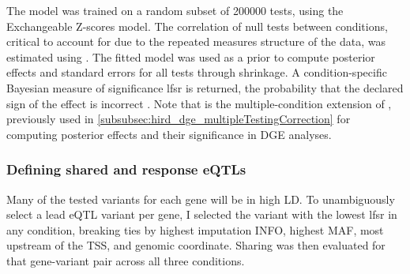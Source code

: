 The  model was trained on a random subset of 200000 tests, using the Exchangeable Z-scores model\autocite{urbut2018FlexibleStatisticalMethods}.
The correlation of null tests between conditions, critical to account for due to the repeated measures structure of the data, was estimated using .
The fitted model was used as a prior to compute posterior effects and standard errors for all tests through shrinkage.
%
A condition-specific Bayesian measure of significance \gls{lfsr} is returned, 
the probability that the declared sign of the effect is incorrect \autocite{stephens2016FalseDiscoveryRates}.
Note that  is the multiple-condition extension of , 
previously used in \cref{subsubsec:hird_dge_multipleTestingCorrection} for computing posterior effects and their significance in \gls{DGE} analyses.

\subsubsection{Defining shared and response eQTLs}

Many of the tested variants for each gene will be in high \gls{LD}.
To unambiguously select a lead \gls{eQTL} variant per gene, I selected the variant with the lowest lfsr in any condition, 
breaking ties by highest imputation INFO, highest \gls{MAF}, most upstream of the \gls{TSS}, and genomic coordinate.
Sharing was then evaluated for that gene-variant pair across all three conditions.


